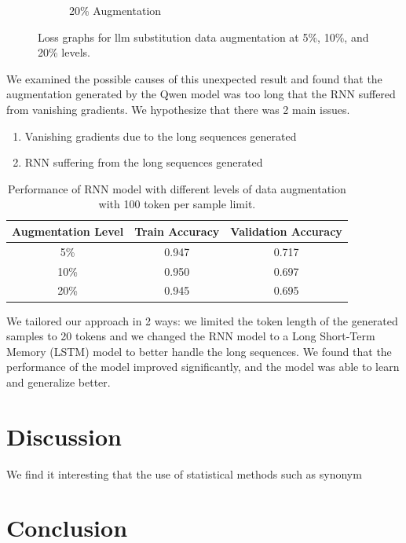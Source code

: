 \documentclass{article}
\begin{document}
\begin{figure}[ht]
\begin{subfigure}[b]{0.3\textwidth}
    \caption{20\% Augmentation}
    \label{fig:llm_loss_20}
  \end{subfigure}
  \caption{Loss graphs for llm substitution data augmentation at 5\%, 10\%, and 20\% levels.}
  \label{fig:llm_substitution_loss}
\end{figure}

We examined the possible causes of this unexpected result and found that the
augmentation generated by the Qwen model was too long that the RNN suffered
from vanishing gradients. We hypothesize that there was 2 main issues.
\begin{enumerate}
  \item Vanishing gradients due to the long sequences generated
  \item RNN suffering from the long sequences generated
\end{enumerate}

\begin{table}[ht]
  \centering
  \begin{tabular}{|c|c|c|}
    \hline
    \textbf{Augmentation Level} & \textbf{Train Accuracy} & \textbf{Validation Accuracy} \\
    \hline
    5\% &  0.947 & 0.717 \\
    \hline
    10\% & 0.950 & 0.697 \\
    \hline
    20\% & 0.945 & 0.695 \\
    \hline
  \end{tabular}
  \caption{Performance of RNN model with different levels of data augmentation with 100 token per sample limit.}
  \label{table:rnn_performance}
\end{table}

We tailored our approach in 2 ways: we limited the token length of the generated
samples to 20 tokens and we changed the RNN model to a Long Short-Term Memory
(LSTM) model to better handle the long sequences. We found that the performance
of the model improved significantly, and the model was able to learn and
generalize better.


\section{Discussion}

We find it interesting that the use of statistical methods such as synonym


\section{Conclusion}



\end{document}
